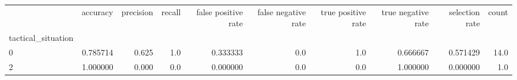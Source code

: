 \begin{tabular}{lrrrrrrrrr}
\toprule
{} &  accuracy &  precision &  recall &  false positive rate &  false negative rate &  true positive rate &  true negative rate &  selection rate &  count \\
tactical\_situation &           &            &         &                      &                      &                     &                     &                 &        \\
\midrule
0                  &  0.785714 &      0.625 &     1.0 &             0.333333 &                  0.0 &                 1.0 &            0.666667 &        0.571429 &   14.0 \\
2                  &  1.000000 &      0.000 &     0.0 &             0.000000 &                  0.0 &                 0.0 &            1.000000 &        0.000000 &    1.0 \\
\bottomrule
\end{tabular}
